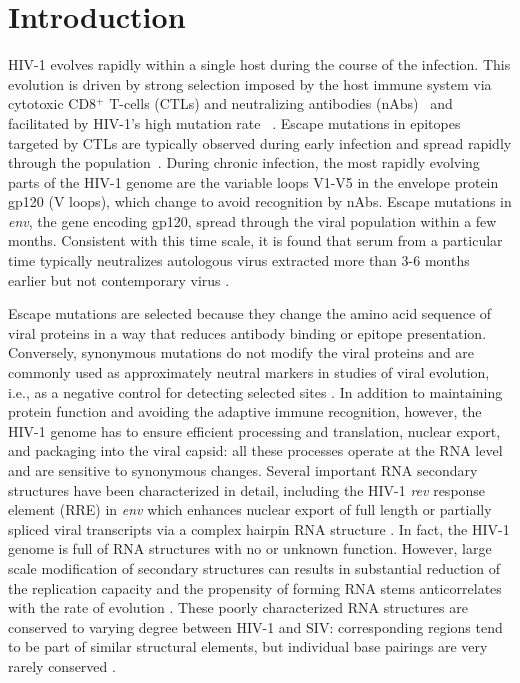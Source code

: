 \documentclass[11pt]{article}
\newcommand{\env}{\textit{env}}
\newcommand{\rev}{\textit{rev}}
\begin{document}
\section*{Introduction}
HIV-1 evolves rapidly within a single host during the course of the infection.
This evolution is driven by strong selection imposed by the host immune system
via cytotoxic CD8${}^+$ T-cells (CTLs) and neutralizing antibodies
(nAbs)~\citep{rambaut_causes_2004} and facilitated by HIV-1's high mutation rate
~\citep{mansky_lower_1995,abram_nature_2010}. Escape mutations
in epitopes targeted by CTLs are typically observed during early infection and spread
rapidly through the population~\citep{mcmichael_immune_2009}. During chronic
infection, the most rapidly evolving parts of the HIV-1 genome are the variable
loops V1-V5 in the envelope protein gp120 (V loops), which change to avoid recognition by
nAbs. Escape mutations in \env{}, the gene encoding gp120, spread through the
viral population within a few months.
Consistent with this time scale, it is found that serum from a particular time
typically neutralizes autologous virus extracted more than 3-6 months earlier but not contemporary
virus \citep{richman_rapid_2003}.

Escape mutations are selected because they change the amino acid sequence of
viral proteins in a way that reduces antibody binding or epitope presentation.
Conversely, synonymous mutations do not modify the viral proteins and are
commonly used as approximately neutral markers in studies of viral evolution,
i.e., as a negative control for detecting selected
sites \citep{Bhatt:2011p43255,Hurst:2002p32608,Chen:2004p22606}. In addition to
maintaining protein function and avoiding the adaptive immune recognition,
however, the HIV-1 genome has to ensure efficient processing and translation,
nuclear export, and packaging into the viral capsid: all these processes operate
at the RNA level and are sensitive to synonymous changes. Several
important RNA secondary structures have been characterized in detail, including the HIV-1
\rev{} response element (RRE) in \env{} which enhances nuclear export of full length
or partially spliced viral transcripts via a complex hairpin RNA structure
\citep{fernandes_hiv-1_2012}. In fact, the HIV-1 genome is full of RNA
structures \citep{watts_architecture_2009} with no or unknown
function. However, large scale modification of secondary structures
can results in substantial reduction of the replication capacity
\citep{keating_rich_2009} and the propensity of forming RNA stems
anticorrelates with the rate of evolution
\citep{forsdyke_reciprocal_1995,snoeck_mapping_2011}. 
These poorly characterized RNA structures are conserved to varying degree between HIV-1 and
SIV: corresponding regions tend to be part
of similar structural elements, but individual base pairings are very
rarely conserved \citep{pollom_comparison_2013}. 
\end{document}
